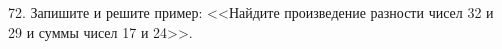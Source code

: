 72. Запишите и решите пример: <<Найдите произведение разности чисел 32 и 29 и суммы чисел 17 и 24>>.\\

